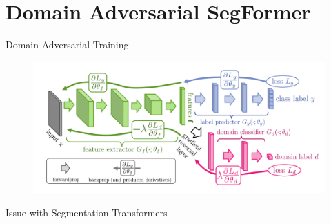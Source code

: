 \documentclass{lib/curtin_format}
\begin{document}
\section{Domain Adversarial SegFormer}
\begin{frame}{Domain Adversarial Training}
    \begin{figure}[h]
        \centering
        \includegraphics[width=\textwidth]{res/domain-adversarial-training.png}
    \end{figure}
\end{frame}

\begin{frame}{Issue with Segmentation Transformers}
    \begin{table}[]
    \end{table}
\end{frame}
\end{document}

